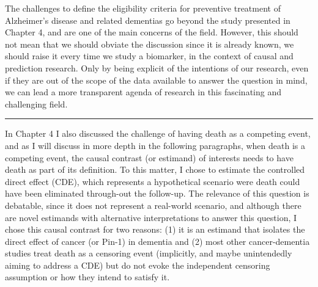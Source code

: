 \documentclass[
]{book}
\begin{document}
The challenges to define the eligibility criteria for preventive treatment of Alzheimer's disease and related dementias go beyond the study presented in Chapter 4, and are one of the main concerns of the field\autocite[\ldots\ldots{}]{cite}. However, this should not mean that we should obviate the discussion since it is already known, we should raise it every time we study a biomarker, in the context of causal and prediction research. Only by being explicit of the intentions of our research, even if they are out of the scope of the data available to answer the question in mind, we can lead a more transparent agenda of research in this fascinating and challenging field.

\begin{center}\rule{0.5\linewidth}{0.5pt}\end{center}

In Chapter 4 I also discussed the challenge of having death as a competing event, and as I will discuss in more depth in the following paragraphs, when death is a competing event, the causal contrast (or estimand) of interests needs to have death as part of its definition. To this matter, I chose to estimate the controlled direct effect (CDE), which represents a hypothetical scenario were death could have been eliminated through-out the follow-up\autocite{young2020}. The relevance of this question is debatable, since it does not represent a real-world scenario, and although there are novel estimands with alternative interpretations to answer this question\autocite{stenruds2020}, I chose this causal contrast for two reasons: (1) it is an estimand that isolates the direct effect of cancer (or Pin-1) in dementia and (2) most other cancer-dementia studies treat death as a censoring event (implicitly, and maybe unintendedly aiming to address a CDE) but do not evoke the independent censoring assumption or how they intend to satisfy it.
\end{document}
